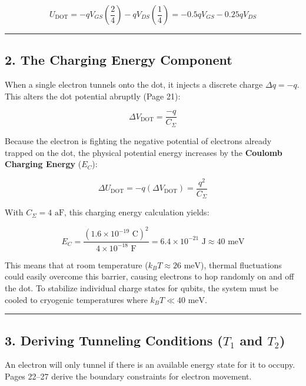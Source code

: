 \documentclass[
]{article}
\begin{document}
\[U_{\text{DOT}} = -q V_{GS}\left(\frac{2}{4}\right) - q V_{DS}\left(\frac{1}{4}\right) = -0.5 q V_{GS} - 0.25 q V_{DS}\]

\begin{center}\rule{0.5\linewidth}{0.5pt}\end{center}

\subsection{2. The Charging Energy
Component}\label{the-charging-energy-component}

When a single electron tunnels onto the dot, it injects a discrete
charge \(\Delta q = -q\). This alters the dot potential abruptly (Page
21):

\[\Delta V_{\text{DOT}} = \frac{-q}{C_{\Sigma}}\]

Because the electron is fighting the negative potential of electrons
already trapped on the dot, the physical potential energy increases by
the \textbf{Coulomb Charging Energy} (\(E_C\)):

\[\Delta U_{\text{DOT}} = -q(\Delta V_{\text{DOT}}) = \frac{q^2}{C_{\Sigma}}\]

With \(C_{\Sigma} = 4\text{ aF}\), this charging energy calculation
yields:

\[E_C = \frac{(1.6 \times 10^{-19}\text{ C})^2}{4 \times 10^{-18}\text{ F}} = 6.4 \times 10^{-21}\text{ J} \approx 40\text{ meV}\]

This means that at room temperature (\(k_B T \approx 26\text{ meV}\)),
thermal fluctuations could easily overcome this barrier, causing
electrons to hop randomly on and off the dot. To stabilize individual
charge states for qubits, the system must be cooled to cryogenic
temperatures where \(k_B T \ll 40\text{ meV}\).

\begin{center}\rule{0.5\linewidth}{0.5pt}\end{center}

\subsection{\texorpdfstring{3. Deriving Tunneling Conditions (\(T_1\)
and
\(T_2\))}{3. Deriving Tunneling Conditions (T\_1 and T\_2)}}\label{deriving-tunneling-conditions-t_1-and-t_2}

An electron will only tunnel if there is an available energy state for
it to occupy. Pages 22--27 derive the boundary constraints for electron
movement.
\end{document}
